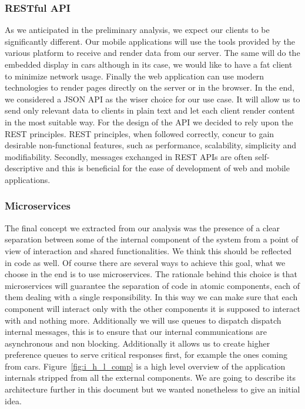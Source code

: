 \subsubsection{RESTful API}
As we anticipated in the preliminary analysis, we expect our clients to be significantly different.
Our mobile applications will use the tools provided by the various platform to receive
and render data from our server. The same will do the embedded display in cars although in its
case, we would like to have a fat client to minimize network usage. Finally the web application
can use modern technologies to render pages directly on the server or in the browser.
In the end, we considered a JSON API as the wiser choice for our use case. It will
allow us to send only relevant data to clients in plain text and let each client
render content in the most suitable way. 
For the design of the API we decided to rely upon the REST principles.
REST principles, when followed correctly, concur to gain desirable non-functional
features, such as performance, scalability, simplicity and modifiability.
Secondly, messages exchanged in REST APIs are often self-descriptive and this is beneficial
for the ease of development of web and mobile applications.

\subsubsection{Microservices}
The final concept we extracted from our analysis was the presence of a clear separation
between some of the internal component of the system from a point of view of interaction
and shared functionalities.
We think this should be reflected in code as well. Of course there are several ways
to achieve this goal, what we choose in the end is to use microservices.
The rationale behind this choice is that microservices will guarantee the separation of code in
atomic components, each of them dealing with a single responsibility.
In this way we can make sure that each component will interact only with the other
components it is supposed to interact with and nothing more.
Additionally we will use queues to dispatch dispatch internal messages,
this is to ensure that our internal communications are asynchronous and non blocking.
Additionally it allows us to create higher preference queues to serve critical responses first,
for example the ones coming from cars.
Figure~\ref{fig:i_h_l_comp} is a high level overview of the application internals stripped from all
the external components. We are going to describe its architecture further in this document
but we wanted nonetheless to give an initial idea.

